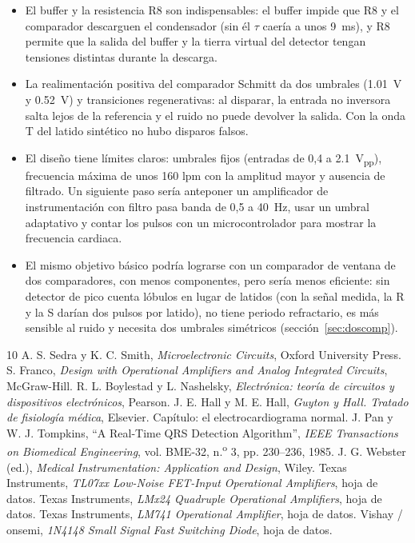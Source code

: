\documentclass[11pt,letterpaper]{article}
\begin{document}
\begin{itemize}
  \item El buffer y la resistencia R8 son indispensables: el buffer impide que R8 y el comparador descarguen el condensador (sin él $\tau$ caería a unos \SI{9}{ms}), y R8 permite que la salida del buffer y la tierra virtual del detector tengan tensiones distintas durante la descarga.
  \item La realimentación positiva del comparador Schmitt da dos umbrales (\SI{1,01}{V} y \SI{0,52}{V}) y transiciones regenerativas: al disparar, la entrada no inversora salta lejos de la referencia y el ruido no puede devolver la salida. Con la onda T del latido sintético no hubo disparos falsos.
  \item El diseño tiene límites claros: umbrales fijos (entradas de 0,4 a \SI{2,1}{V_{pp}}), frecuencia máxima de unos 160 lpm con la amplitud mayor y ausencia de filtrado. Un siguiente paso sería anteponer un amplificador de instrumentación con filtro pasa banda de 0,5 a \SI{40}{Hz}, usar un umbral adaptativo y contar los pulsos con un microcontrolador para mostrar la frecuencia cardiaca.
  \item El mismo objetivo básico podría lograrse con un comparador de ventana de dos comparadores, con menos componentes, pero sería menos eficiente: sin detector de pico cuenta lóbulos en lugar de latidos (con la señal medida, la R y la S darían dos pulsos por latido), no tiene periodo refractario, es más sensible al ruido y necesita dos umbrales simétricos (sección~\ref{sec:doscomp}).
\end{itemize}

\begin{thebibliography}{10}
 A. S. Sedra y K. C. Smith, \emph{Microelectronic Circuits}, Oxford University Press.
 S. Franco, \emph{Design with Operational Amplifiers and Analog Integrated Circuits}, McGraw-Hill.
 R. L. Boylestad y L. Nashelsky, \emph{Electrónica: teoría de circuitos y dispositivos electrónicos}, Pearson.
 J. E. Hall y M. E. Hall, \emph{Guyton y Hall. Tratado de fisiología médica}, Elsevier. Capítulo: el electrocardiograma normal.
 J. Pan y W. J. Tompkins, ``A Real-Time QRS Detection Algorithm'', \emph{IEEE Transactions on Biomedical Engineering}, vol. BME-32, n.\textsuperscript{o} 3, pp. 230--236, 1985.
 J. G. Webster (ed.), \emph{Medical Instrumentation: Application and Design}, Wiley.
 Texas Instruments, \emph{TL07xx Low-Noise FET-Input Operational Amplifiers}, hoja de datos.
 Texas Instruments, \emph{LMx24 Quadruple Operational Amplifiers}, hoja de datos.
 Texas Instruments, \emph{LM741 Operational Amplifier}, hoja de datos.
 Vishay / onsemi, \emph{1N4148 Small Signal Fast Switching Diode}, hoja de datos.
\end{thebibliography}
\end{document}
